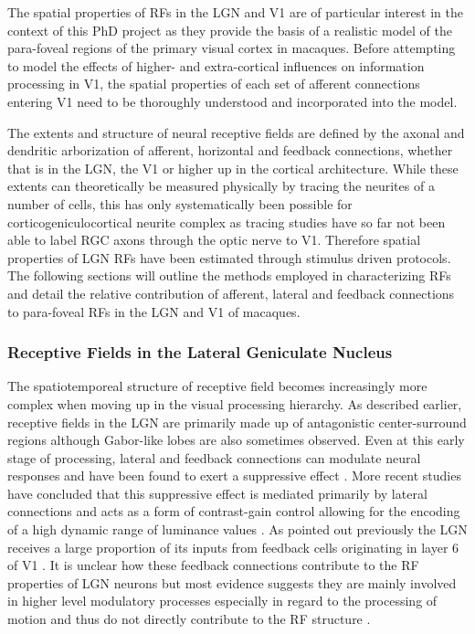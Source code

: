 The spatial properties of RFs in the LGN and V1 are of particular
interest in the context of this PhD project as they provide the basis
of a realistic model of the para-foveal regions of the primary visual
cortex in macaques. Before attempting to model the effects of higher-
and extra-cortical influences on information processing in V1, the
spatial properties of each set of afferent connections entering V1
need to be thoroughly understood and incorporated into the model.

The extents and structure of neural receptive fields are defined by
the axonal and dendritic arborization of afferent, horizontal and
feedback connections, whether that is in the LGN, the V1 or higher up
in the cortical architecture. While these extents can theoretically be
measured physically by tracing the neurites of a number of cells, this
has only systematically been possible for corticogeniculocortical
neurite complex as tracing studies have so far not been able to label
RGC axons through the optic nerve to V1. Therefore spatial properties
of LGN RFs have been estimated through stimulus driven protocols. The
following sections will outline the methods employed in characterizing
RFs and detail the relative contribution of afferent, lateral and
feedback connections to para-foveal RFs in the LGN and V1 of macaques.

\subsubsection{Receptive Fields in the Lateral Geniculate Nucleus}
\label{sec:LGNRF}

The spatiotemporeal structure of receptive field becomes increasingly
more complex when moving up in the visual processing hierarchy. As
described earlier, receptive fields in the LGN are primarily made up
of antagonistic center-surround regions although Gabor-like lobes are
also sometimes observed. Even at this early stage of processing,
lateral and feedback connections can modulate neural responses and
have been found to exert a suppressive effect \citep{Hubel1961}. More
recent studies have concluded that this suppressive effect is mediated
primarily by lateral connections and acts as a form of contrast-gain
control allowing for the encoding of a high dynamic range of luminance
values \cite{Bonin2005}. As pointed out previously the LGN receives a
large proportion of its inputs from feedback cells originating in
layer 6 of V1 \citep{Sherman2002}. It is unclear how these feedback
connections contribute to the RF properties of LGN neurons but most
evidence suggests they are mainly involved in higher level modulatory
processes especially in regard to the processing of motion and thus do
not directly contribute to the RF structure \citep{Sillito2006}.


